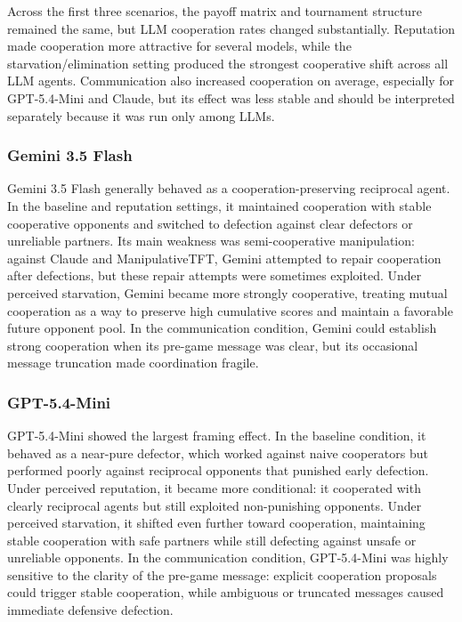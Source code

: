\documentclass[11pt]{article}
\begin{document}
Across the first three scenarios, the payoff matrix and tournament structure remained the same, but LLM cooperation rates changed substantially. Reputation made cooperation more attractive for several models, while the starvation/elimination setting produced the strongest cooperative shift across all LLM agents. Communication also increased cooperation on average, especially for GPT-5.4-Mini and Claude, but its effect was less stable and should be interpreted separately because it was run only among LLMs.

\subsubsection{Gemini 3.5 Flash}

Gemini 3.5 Flash generally behaved as a cooperation-preserving reciprocal agent. In the baseline and reputation settings, it maintained cooperation with stable cooperative opponents and switched to defection against clear defectors or unreliable partners. Its main weakness was semi-cooperative manipulation: against Claude and ManipulativeTFT, Gemini attempted to repair cooperation after defections, but these repair attempts were sometimes exploited. Under perceived starvation, Gemini became more strongly cooperative, treating mutual cooperation as a way to preserve high cumulative scores and maintain a favorable future opponent pool. In the communication condition, Gemini could establish strong cooperation when its pre-game message was clear, but its occasional message truncation made coordination fragile.

\subsubsection{GPT-5.4-Mini}

GPT-5.4-Mini showed the largest framing effect. In the baseline condition, it behaved as a near-pure defector, which worked against naive cooperators but performed poorly against reciprocal opponents that punished early defection. Under perceived reputation, it became more conditional: it cooperated with clearly reciprocal agents but still exploited non-punishing opponents. Under perceived starvation, it shifted even further toward cooperation, maintaining stable cooperation with safe partners while still defecting against unsafe or unreliable opponents. In the communication condition, GPT-5.4-Mini was highly sensitive to the clarity of the pre-game message: explicit cooperation proposals could trigger stable cooperation, while ambiguous or truncated messages caused immediate defensive defection.
\end{document}
